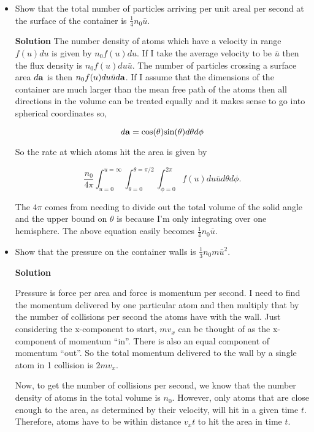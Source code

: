 \documentclass[12pt]{article}
\begin{document}
\begin{itemize}

\item Show that the total number of particles arriving per unit areal per second at
the surface of the container is $\frac{1}{4}n_0\bar{u}$.

{\bf Solution}
The number density of atoms which have a velocity in range $f(u)du$ is given by $n_0f(u)du$. If I take the average velocity to be $\bar u$ then the flux density is $n_0f(u)du \bar u$. The number of particles crossing a surface area $d{\bf a}$ is then $n_0f(u)du \bar u d{\bf a}$. If I assume that the dimensions of the container are much larger than the mean free path of the atoms then all directions in the volume can be treated equally and it makes sense to go into spherical coordinates so,

\begin{equation}
d{\bf a} = {\rm cos}(\theta){\rm sin}(\theta)d\theta d\phi
\end{equation}

So the rate at which atoms hit the area is given by 

\begin{equation}
\frac{n_0}{4\pi}\int_{u=0}^{u=\infty}\int_{\theta=0}^{\theta=\pi/2}\int_{\phi=0}^{2\pi} f(u)du \bar ud\theta d\phi.
\end{equation}

The $4\pi$ comes from needing to divide out the total volume of the solid angle and the upper bound on $\theta$ is because I'm only integrating over one hemisphere. The above equation easily becomes $\frac{1}{4}n_0\bar u$.

\item Show that the pressure on the container walls is $\frac{1}{3}n_0m \bar{u}^2$.

{\bf Solution}

Pressure is force per area and force is momentum per second. I need to find the momentum delivered by one particular atom and then multiply that by the number of collisions per second the atoms have with the wall. Just considering the x-component  to start, $mv_x$ can be thought of as the x-component of momentum ``in''. There is also an equal component of momentum ``out''. So the total momentum delivered to the wall by a single atom in 1 collision is $2mv_x$.

Now, to get the number of collisions per second, we know that the number density of atoms in the total volume is $n_0$. However, only atoms that are close enough to the area, as determined by their velocity, will hit in a given time $t$. Therefore, atoms have to be within distance $v_xt$ to hit the area in time $t$.


\end{itemize}
\end{document}
